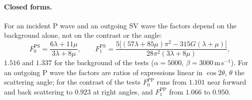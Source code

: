 \documentclass[11pt,a4paper]{article}
\begin{document}
\paragraph{Closed forms.} For an incident P wave and an outgoing SV wave the factors depend on the
background alone, not on the contrast or the angle:
\begin{equation}\label{eq:Fps}
  F_0^{\mathrm{PS}}=\frac{6\lambda+11\mu}{3\lambda+8\mu},\qquad
  F_1^{\mathrm{PS}}=\frac{5\bigl[(57\lambda+85\mu)\pi^2-315G(\lambda+\mu)\bigr]}{28\pi^2(3\lambda+8\mu)},
\end{equation}
$1.516$ and $1.337$ for the background of the tests ($\alpha=5000$, $\beta=3000$\,m\,s$^{-1}$). For an
outgoing P wave the factors are ratios of expressions linear in $\cos2\theta$, $\theta$ the scattering
angle; for the contrast of the tests $F_0^{\mathrm{PP}}$ runs from $1.101$ near forward and back
scattering to $0.923$ at right angles, and $F_1^{\mathrm{PP}}$ from $1.066$ to $0.950$.
\end{document}
